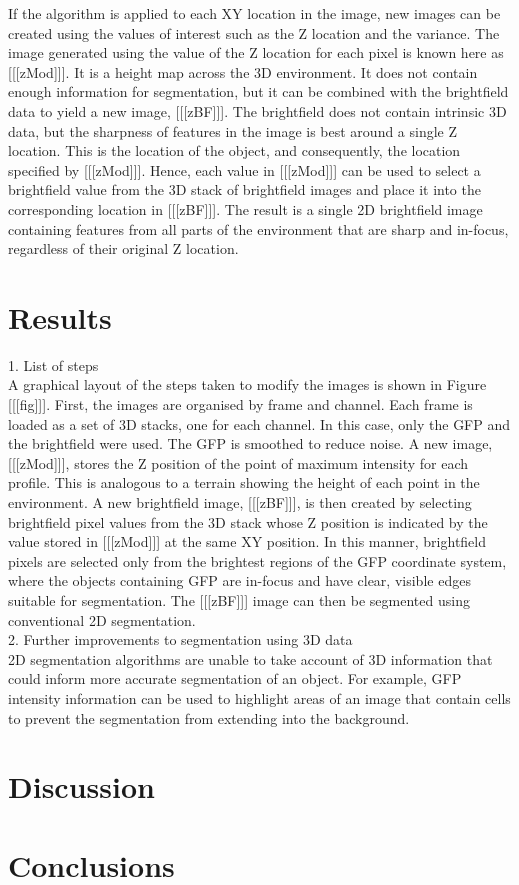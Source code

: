 \documentclass[12pt]{article}
\begin{document}
If the algorithm is applied to each XY location in the image, new images can be created using the values of interest such as the Z location and the variance. The image generated using the value of the Z location for each pixel is known here as [[[zMod]]]. It is a height map across the 3D environment. It does not contain enough information for segmentation, but it can be combined with the brightfield data to yield a new image, [[[zBF]]]. The brightfield does not contain intrinsic 3D data, but the sharpness of features in the image is best around a single Z location. This is the location of the object, and consequently, the location specified by [[[zMod]]]. Hence, each value in [[[zMod]]] can be used to select a brightfield value from the 3D stack of brightfield images and place it into the corresponding location in [[[zBF]]]. The result is a single 2D brightfield image containing features from all parts of the environment that are sharp and in-focus, regardless of their original Z location. \\

\section{Results}
1. List of steps \\

A graphical layout of the steps taken to modify the images is shown in Figure [[[fig]]]. First, the images are organised by frame and channel. Each frame is loaded as a set of 3D stacks, one for each channel. In this case, only the GFP and the brightfield were used. The GFP is smoothed to reduce noise. A new image, [[[zMod]]], stores the Z position of the point of maximum intensity for each profile. This is analogous to a terrain showing the height of each point in the environment. A new brightfield image, [[[zBF]]], is then created by selecting brightfield pixel values from the 3D stack whose Z position is indicated by the value stored in [[[zMod]]] at the same XY position. In this manner, brightfield pixels are selected only from the brightest regions of the GFP coordinate system, where the objects containing GFP are in-focus and have clear, visible edges suitable for segmentation. The [[[zBF]]] image can then be segmented using conventional 2D segmentation. \\

2. Further improvements to segmentation using 3D data \\

2D segmentation algorithms are unable to take account of 3D information that could inform more accurate segmentation of an object. For example, GFP intensity information can be used to highlight areas of an image that contain cells to prevent the segmentation from extending into the background. \\

\section{Discussion}


\section{Conclusions}
\end{document}
